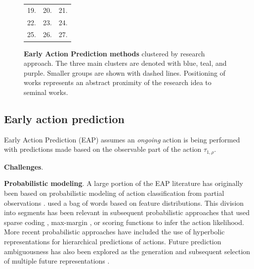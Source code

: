 \documentclass[smallextended,twocolumn,natbib]{svjour3}
\begin{document}
\begin{figure}
{\begin{tabular}{lll}
         19. \citet{cai2019action} &
         20. \citet{fernando2021anticipating} &
         21. \citet{wang2019progressive} \\
         22. \citet{hou2020confidence} &
         23. \citet{xu2019prediction} &
         24. \citet{zheng2023egocentric} \\
         25. \citet{xu2023dynamic} &
         26. \citet{foo2022era} &
         27. \citet{hu2018early} \\
    \end{tabular}
    }
    \caption{\textbf{Early Action Prediction methods} clustered by research approach. The three main clusters are denoted with \textcolor{babyblue}{blue}, \textcolor{pastelteal}{teal}, and \textcolor{pastelpurple}{purple}. Smaller groups are shown with dashed lines. Positioning of works represents an abstract proximity of the research idea to seminal works.}
    \label{fig:eap_methods}
    \vspace{-1em}
\end{figure}

\subsection{Early action prediction}

Early Action Prediction (EAP) assumes an \emph{ongoing} action is being performed with predictions made based on the observable part of the action $\tau_{1,\rho}$. 

\noindent
\textbf{Challenges}.

\noindent
\textbf{Probabilistic modeling}. A large portion of the EAP literature has originally been based on probabilistic modeling of action classification from partial observations \citep{cao2013recognize,hoai2014max,li2012modeling,li2014prediction,ryoo2011human}. \citet{ryoo2011human} used a bag of words based on feature distributions. This division into segments has been relevant in subsequent probabilistic approaches that used sparse coding \citep{cao2013recognize}, max-margin \citep{hoai2014max}, or scoring functions \citep{li2012modeling,li2014prediction} to infer the action likelihood. More recent probabilistic approaches have included the use of hyperbolic representations \citep{suris2021learning} for hierarchical predictions of actions. Future prediction ambiguousness has also been explored as the generation and subsequent selection of multiple future representations \citep{chen2022ambiguousness}.
\end{document}

